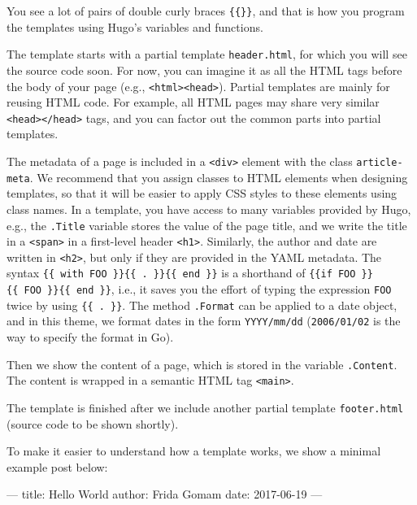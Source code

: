 \documentclass[12pt,]{krantz}
\makeatletter
\newenvironment{Shaded}{\begin{snugshade}}{\end{snugshade}}
\newcommand{\NormalTok}[1]{#1}
\newenvironment{kframe}{%
\medskip{}
\setlength{\fboxsep}{.8em}
 \def\at@end@of@kframe{}%
 \ifinner\ifhmode%
  \def\at@end@of@kframe{\end{minipage}}%
  \begin{minipage}{\columnwidth}%
 \fi\fi%
 \def\FrameCommand##1{\hskip\@totalleftmargin \hskip-\fboxsep
 \colorbox{shadecolor}{##1}\hskip-\fboxsep
     \hskip-\linewidth \hskip-\@totalleftmargin \hskip\columnwidth}%
 \MakeFramed {\advance\hsize-\width
   \@totalleftmargin\z@ \linewidth\hsize
   \@setminipage}}%
 {\par\unskip\endMakeFramed%
 \at@end@of@kframe}
\renewenvironment{Shaded}{\begin{kframe}}{\end{kframe}}
\theoremstyle{definition}
\theoremstyle{definition}
\theoremstyle{definition}
\theoremstyle{remark}
\makeatother
\begin{document}
\begin{itemize}
\begin{itemize}
    You see a lot of pairs of double curly braces \texttt{\{\{\}\}}, and
    that is how you program the templates using Hugo's variables and
    functions.

    The template starts with a partial template \texttt{header.html},
    for which you will see the source code soon. For now, you can
    imagine it as all the HTML tags before the body of your page (e.g.,
    \texttt{\textless{}html\textgreater{}\textless{}head\textgreater{}}).
    Partial templates are mainly for reusing HTML code.
    For example, all HTML pages may share very similar
    \texttt{\textless{}head\textgreater{}\textless{}/head\textgreater{}}
    tags, and you can factor out the common parts into partial
    templates.

    The metadata of a page is included in a
    \texttt{\textless{}div\textgreater{}} element with the class
    \texttt{article-meta}. We recommend that you assign classes to HTML
    elements when designing templates, so that it will be easier to
    apply CSS styles to these elements using class names. In a template,
    you have access to many variables provided by Hugo, e.g., the
    \texttt{.Title} variable stores the value of the page title, and we
    write the title in a \texttt{\textless{}span\textgreater{}} in a
    first-level header \texttt{\textless{}h1\textgreater{}}. Similarly,
    the author and date are written in
    \texttt{\textless{}h2\textgreater{}}, but only if they are provided
    in the YAML metadata. The syntax
    \texttt{\{\{\ with\ FOO\ \}\}\{\{\ .\ \}\}\{\{\ end\ \}\}} is a
    shorthand of
    \texttt{\{\{if\ FOO\ \}\}\{\{\ FOO\ \}\}\{\{\ end\ \}\}}, i.e., it
    saves you the effort of typing the expression \texttt{FOO} twice by
    using \texttt{\{\{\ .\ \}\}}. The method \texttt{.Format} can be
    applied to a date object, and in this theme, we format dates in the
    form \texttt{YYYY/mm/dd} (\texttt{2006/01/02} is the way to specify
    the format in Go).

    Then we show the content of a page, which is stored in the variable
    \texttt{.Content}. The content is wrapped in a semantic HTML tag
    \texttt{\textless{}main\textgreater{}}.

    The template is finished after we include another partial template
    \texttt{footer.html} (source code to be shown shortly).

    To make it easier to understand how a template works, we show a
    minimal example post below:

\begin{Shaded}
\begin{Highlighting}[]
\NormalTok{---}
\NormalTok{title: Hello World}
\NormalTok{author: Frida Gomam}
\NormalTok{date: 2017-06-19}
\NormalTok{---}


\end{Highlighting}
\end{Shaded}
\end{itemize}
\end{itemize}
\end{document}

